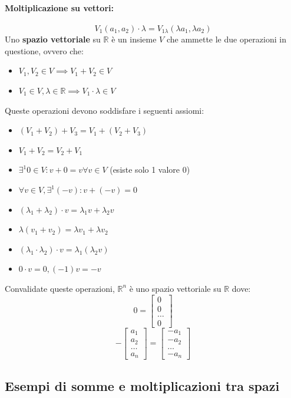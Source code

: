 \documentclass[12pt,a4paper]{article}
\begin{document}
\paragraph{Moltiplicazione su vettori:}
\[
V_1(a_1, a_2) \cdot \lambda = V_{1\lambda}(\lambda a_1, \lambda a_2)
\]
Uno \textbf{spazio vettoriale} su $\mathbb{R}$ è un insieme $V$ che ammette le due operazioni in questione, ovvero che:
\begin{itemize}
  \item $V_1,V_2 \in V \implies V_1 + V_2 \in V$
  \item $V_1 \in V, \lambda \in \mathbb{R} \implies V_1 \cdot \lambda \in V$
\end{itemize}
Queste operazioni devono soddisfare i seguenti assiomi:
\begin{itemize}
  \item $(V_1 + V_2) + V_3 = V_1 + (V_2 + V_3)$
  \item $V_1 + V_2 = V_2 + V_1$
  \item $\exists^1 0 \in V : v + 0 = v \forall v \in V$ (esiste solo 1 valore 0)
  \item $\forall v \in V, \exists^1 (-v) : v + (-v) = 0$
  \item $(\lambda_1 + \lambda_2) \cdot v = \lambda_1v + \lambda_2v$
  \item $\lambda(v_1 + v_2) = \lambda v_1 + \lambda v_2$
  \item $(\lambda_1 \cdot \lambda_2) \cdot v = \lambda_1(\lambda_2v)$
  \item $0 \cdot v = 0, (-1)v = -v$
\end{itemize}
Convalidate queste operazioni, $\mathbb{R}^n$ è uno spazio vettoriale su $\mathbb{R}$ dove:
\[
0 = \begin{bmatrix}
  0\\
  0\\
  \ldots\\
  0
\end{bmatrix}
\]
\[
-\begin{bmatrix}
  a_1\\
  a_2\\
  \ldots\\
  a_n
\end{bmatrix}
 = \begin{bmatrix}
  - a_1\\
  - a_2\\
  \ldots\\
  - a_n
 \end{bmatrix}
\]
\subsection{Esempi di somme e moltiplicazioni tra spazi}
\end{document}
